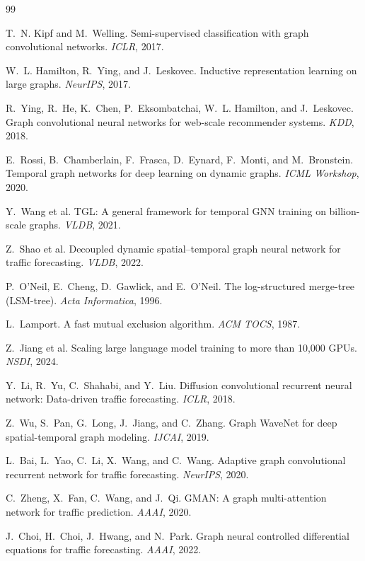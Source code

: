 \documentclass{article}
\begin{document}
\begin{thebibliography}{99}

 T.~N. Kipf and M.~Welling. Semi-supervised classification with
graph convolutional networks. \emph{ICLR}, 2017.

 W.~L. Hamilton, R.~Ying, and J.~Leskovec. Inductive
representation learning on large graphs. \emph{NeurIPS}, 2017.

 R.~Ying, R.~He, K.~Chen, P.~Eksombatchai, W.~L. Hamilton, and
J.~Leskovec. Graph convolutional neural networks for web-scale recommender systems.
\emph{KDD}, 2018.

 E.~Rossi, B.~Chamberlain, F.~Frasca, D.~Eynard, F.~Monti, and
M.~Bronstein. Temporal graph networks for deep learning on dynamic graphs.
\emph{ICML Workshop}, 2020.

 Y.~Wang et al. TGL: A general framework for temporal GNN training on
billion-scale graphs. \emph{VLDB}, 2021.

 Z.~Shao et al. Decoupled dynamic spatial--temporal graph neural network for
traffic forecasting. \emph{VLDB}, 2022.

 P.~O'Neil, E.~Cheng, D.~Gawlick, and E.~O'Neil. The log-structured
merge-tree (LSM-tree). \emph{Acta Informatica}, 1996.

 L.~Lamport. A fast mutual exclusion algorithm. \emph{ACM TOCS},
1987.

 Z.~Jiang et al. Scaling large language model training to more
than 10,000 GPUs. \emph{NSDI}, 2024.

 Y.~Li, R.~Yu, C.~Shahabi, and Y.~Liu. Diffusion convolutional
recurrent neural network: Data-driven traffic forecasting. \emph{ICLR}, 2018.

 Z.~Wu, S.~Pan, G.~Long, J.~Jiang, and C.~Zhang. Graph WaveNet for
deep spatial-temporal graph modeling. \emph{IJCAI}, 2019.

 L.~Bai, L.~Yao, C.~Li, X.~Wang, and C.~Wang. Adaptive graph
convolutional recurrent network for traffic forecasting. \emph{NeurIPS}, 2020.

 C.~Zheng, X.~Fan, C.~Wang, and J.~Qi. GMAN: A graph multi-attention
network for traffic prediction. \emph{AAAI}, 2020.

 J.~Choi, H.~Choi, J.~Hwang, and N.~Park. Graph neural controlled
differential equations for traffic forecasting. \emph{AAAI}, 2022.


\end{thebibliography}
\end{document}
